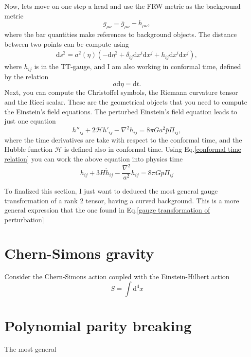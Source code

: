 \documentclass{article}
\begin{document}
Now, lets move on one step a head and use the FRW metric as the background metric
\begin{equation}
    g_{\mu\nu} = \bar{g}_{\mu\nu} + h_{\mu\nu},
\end{equation}
where the bar quantities make references to background objects. The distance between two
points can be compute using
\begin{align}
    \mathrm{d}s^{2} = a^{2}(\eta)\left(-\mathrm{d}\eta^2 
    + \delta_{ij}\mathrm{d}x^{i}\mathrm{d}x^{j}
    + h_{ij}\mathrm{d}x^{i}\mathrm{d}x^{j}\right),
\end{align}
where $h_{ij}$ is in the TT-gauge, and I am also working in conformal time, defined 
by the relation 
\begin{equation}
    \label{conformal time relation}
    a\mathrm{d}\eta = \mathrm{d}t.
\end{equation} 
Next, you can compute the Christoffel symbols, the Riemann curvature tensor and the 
Ricci scalar. These are the geometrical objects that you need to compute the Einstein's 
field equations. The perturbed Einstein's field equation leads to just one equation
\begin{equation}
    h''_{ij} + 2\mathcal{H}h'_{ij} - \nabla^{2}h_{ij} = 8\pi G a^{2}\bar{p}\Pi_{ij},
\end{equation}
where the time derivatives are take with respect to the conformal time, and the Hubble function
$\mathcal{H}$ is defined also in conformal time. Using Eq.\eqref{conformal time relation} you can
work the above equation into physics time
\begin{equation}
    \ddot{h}_{ij} + 3H\dot{h}_{ij} - \frac{\nabla^{2}}{a^{2}}h_{ij} = 8\pi G \bar{p}\Pi_{ij}
\end{equation}

To finalized this section, I just want to deduced the most general gauge transformation
of a rank 2 tensor, having a curved background. This is a more general expression that the one
found in Eq.\eqref{gauge transformation of perturbation}

\section{Chern-Simons gravity}

Consider the Chern-Simons action coupled with the Einstein-Hilbert action
\begin{equation}
    S = \int \mathrm{d}^4x 
\end{equation}

\section{Polynomial parity breaking}

The most general 




\end{document}
